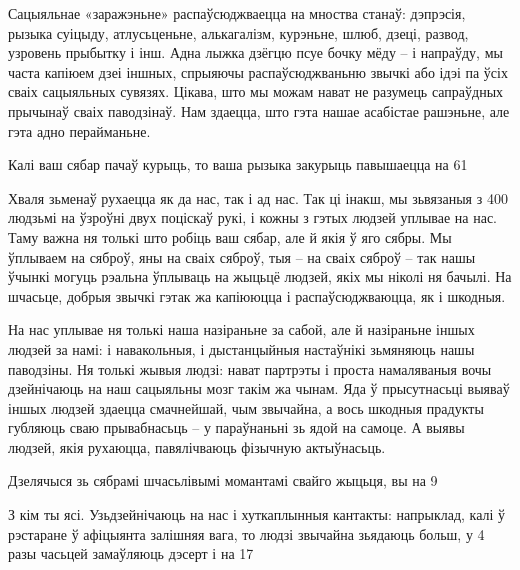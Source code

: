Сацыяльнае «заражэньне» распаўсюджваецца на мноства станаў: дэпрэсія, рызыка суіцыду, атлусьценьне, алькагалізм, курэньне, шлюб, дзеці, развод, узровень прыбытку і інш. Адна лыжка дзёгцю псуе бочку мёду – і напраўду, мы часта капіюем дзеі іншных, спрыяючы распаўсюджваньню звычкі або ідэі па ўсіх сваіх сацыяльных сувязях. Цікава, што мы можам нават не разумець сапраўдных прычынаў сваіх паводзінаў. Нам здаецца, што гэта нашае асабістае рашэньне, але гэта адно перайманьне.

Калі ваш сябар пачаў курыць, то ваша рызыка закурыць павышаецца на 61%

Хваля зьменаў рухаецца як да нас, так і ад нас. Так ці інакш, мы зьвязаныя з 400 людзьмі на ўзроўні двух поціскаў рукі, і кожны з гэтых людзей уплывае на нас. Таму важна ня толькі што робіць ваш сябар, але й якія ў яго сябры. Мы ўплываем на сяброў, яны на сваіх сяброў, тыя – на сваіх сяброў – так нашы ўчынкі могуць рэальна ўплываць на жыцьцё людзей, якіх мы ніколі ня бачылі. На шчасьце, добрыя звычкі гэтак жа капіююцца і распаўсюджваюцца, як і шкодныя.

На нас уплывае ня толькі наша назіраньне за сабой, але й назіраньне іншых людзей за намі: і навакольныя, і дыстанцыйныя настаўнікі зьмяняюць нашы паводзіны. Ня толькі жывыя людзі: нават партрэты і проста намаляваныя вочы дзейнічаюць на наш сацыяльны мозг такім жа чынам. Яда ў прысутнасьці выяваў іншых людзей здаецца смачнейшай, чым звычайна, а вось шкодныя прадукты губляюць сваю прывабнасьць – у параўнаньні зь ядой на самоце. А выявы людзей, якія рухаюцца, павялічваюць фізычную актыўнасьць.

Дзелячыся зь сябрамі шчасьлівымі момантамі свайго жыцьця, вы на 9%

З кім ты ясі. Узьдзейнічаюць на нас і хуткаплынныя кантакты: напрыклад, калі ў рэстаране ў афіцыянта залішняя вага, то людзі звычайна зьядаюць больш, у 4 разы часьцей замаўляюць дэсерт і на 17%

